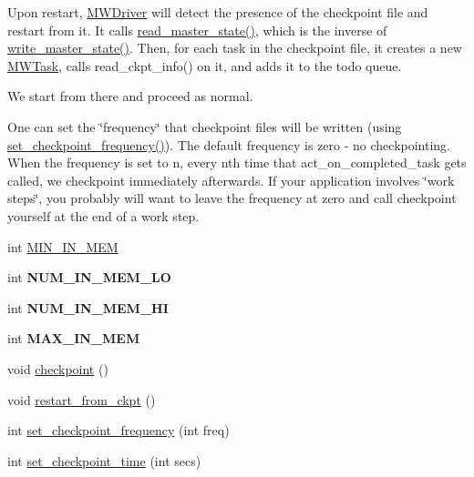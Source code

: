 Upon restart, \hyperlink{classMWDriver}{M\+W\+Driver} will detect the presence of the checkpoint file and restart from it. It calls \hyperlink{classMWDriver_ab575d8dec66c8edadc165ebc6ea4e5a9}{read\+\_\+master\+\_\+state()}, which is the inverse of \hyperlink{classMWDriver_ab3a42409894c40f6992f01b433174588}{write\+\_\+master\+\_\+state()}. Then, for each task in the checkpoint file, it creates a new \hyperlink{classMWTask}{M\+W\+Task}, calls read\+\_\+ckpt\+\_\+info() on it, and adds it to the todo queue.

We start from there and proceed as normal.

One can set the \char`\"{}frequency\char`\"{} that checkpoint files will be written (using \hyperlink{classMWDriver_aa34fc54dfba3806db87c297c8b39244a}{set\+\_\+checkpoint\+\_\+frequency()}). The default frequency is zero -\/ no checkpointing. When the frequency is set to n, every nth time that act\+\_\+on\+\_\+completed\+\_\+task gets called, we checkpoint immediately afterwards. If your application involves \char`\"{}work steps\char`\"{}, you probably will want to leave the frequency at zero and call checkpoint yourself at the end of a work step. \begin{DoxyCompactItemize}
\item 
int \hyperlink{classMWDriver_a033da9ddab14c10d0c174ee778234221}{M\+I\+N\+\_\+\+I\+N\+\_\+\+M\+EM}
\item 
\mbox{\label{classMWDriver_a8b7f11eb5034f28a30e51889e0a005b9}} 
int {\bfseries N\+U\+M\+\_\+\+I\+N\+\_\+\+M\+E\+M\+\_\+\+LO}
\item 
\mbox{\label{classMWDriver_aa3a1e82a5a6cb3cd9a7d3103f0d2f00e}} 
int {\bfseries N\+U\+M\+\_\+\+I\+N\+\_\+\+M\+E\+M\+\_\+\+HI}
\item 
\mbox{\label{classMWDriver_af1534851c44c7bddddac325f7ab490e8}} 
int {\bfseries M\+A\+X\+\_\+\+I\+N\+\_\+\+M\+EM}
\item 
void \hyperlink{classMWDriver_ad41bdc32bc2f56f7816810bc4d260db2}{checkpoint} ()
\item 
void \hyperlink{classMWDriver_af6a5b937b85d5a6cb90961249006942c}{restart\+\_\+from\+\_\+ckpt} ()
\item 
int \hyperlink{classMWDriver_aa34fc54dfba3806db87c297c8b39244a}{set\+\_\+checkpoint\+\_\+frequency} (int freq)
\item 
int \hyperlink{classMWDriver_a7f803ede53bb0d797bce81d56a33cdf9}{set\+\_\+checkpoint\+\_\+time} (int secs)

\end{DoxyCompactItemize}
